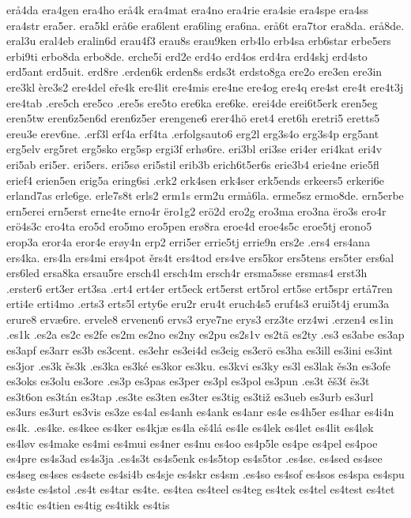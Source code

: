 erå4da
era4gen
era4ho
erå4k
era4mat
era4no
era4rie
era4sie
era4spe
era4ss
era4str
era5er.
era5kl
erå6e
era6lent
era6ling
era6na.
erå6t
era7tor
era8da.
erå8de.
eral3u
eral4eb
eralin6d
erau4f3
erau8s
erau9ken
erb4lo
erb4sa
erb6star
erbe5ers
erbi9ti
erbo8da
erbo8de.
erche5i
erd2e
erd4o
erd4os
erd4ra
erd4skj
erd4sto
erd5ant
erd5uit.
erd8re
.erden6k
erden8s
erds3t
erdsto8ga
ere2o
ere3en
ere3in
ere3kl
ère3s2
ere4del
eře4k
ere4lit
ere4mis
ere4ne
ere4og
ere4q
ere4st
ere4t
ere4t3j
ere4tab
.ere5ch
ere5co
.ere5s
ere5to
ere6ka
ere6ke.
erei4de
erei6t5erk
eren5eg
eren5tw
eren6z5en6d
eren6z5er
erengene6
erer4hö
eret4
eret6h
eretri5
eretts5
ereu3e
erev6ne.
.erf3l
erf4a
erf4ta
.erfolgsauto6
erg2l
erg3s4o
erg3s4p
erg5ant
erg5elv
erg5ret
erg5sko
erg5sp
ergi3f
erhø6re.
eri3bl
eri3se
eri4er
eri4kat
eri4v
eri5ab
eri5er.
eri5ers.
eri5sø
eri5stil
erib3b
erich6t5er6s
erie3b4
erie4ne
erie5fl
erief4
erien5en
erig5a
ering6si
.erk2
erk4sen
erk4ser
erk5ends
erkeers5
erkeri6e
erland7as
erle6ge.
erle7s8t
erls2
erm1s
erm2u
ermå6la.
erme5sz
ermo8de.
ern5erbe
ern5erei
ern5erst
erne4te
erno4r
ëro1g2
erö2d
ero2g
ero3ma
ero3na
ëro3s
ero4r
erö4s3c
ero4ta
ero5d
ero5mo
ero5pen
erø8ra
eroe4d
eroe4s5c
eroe5tj
erono5
erop3a
eror4a
eror4e
erøy4n
erp2
erri5er
errie5tj
errie9n
ers2e
.ers4
ers4ana
ers4ka.
ers4la
ers4mi
ers4pot
ěrs4t
ers4tod
ers4ve
ers5kor
ers5tens
ers5ter
ers6al
ers6led
ersa8ka
ersau5re
ersch4l
ersch4m
ersch4r
ersma5sse
ersmas4
erst3h
.erster6
ert3er
ert3sa
.ert4
ert4er
ert5eck
ert5erst
ert5rol
ert5se
ert5spr
ertå7ren
erti4e
erti4mo
.erts3
erts5l
erty6e
eru2r
eru4t
eruch4s5
eruf4s3
erui5t4j
erum3a
erure8
ervæ6re.
ervele8
ervenen6
ervs3
erye7ne
erys3
erz3te
erz4wi
.erzen4
es1in
.es1k
.es2a
es2c
es2fe
es2m
es2no
es2ny
es2pu
es2s1v
es2tä
es2ty
.es3
es3abe
es3ap
es3apf
es3arr
es3b
es3cent.
es3ehr
es3ei4d
es3eig
es3erö
es3ha
es3ill
es3ini
es3int
es3jor
.es3k
ěs3k
.es3ka
es3ké
es3kor
es3ku.
es3kvi
es3ky
es3l
es3lak
ěs3n
es3ofe
es3oks
es3olu
es3ore
.es3p
es3pas
es3per
es3pl
es3pol
es3pun
.es3t
ěš3ť
ës3t
es3t6on
es3tán
es3tap
.es3te
es3ten
es3ter
es3tig
es3tiž
es3ueb
es3urb
es3url
es3urs
es3urt
es3vis
es3ze
es4al
es4anh
es4ank
es4anr
es4e
es4h5er
es4har
es4i4n
es4k.
.es4ke.
es4kee
es4ker
es4kjæ
es4la
eš4lá
es4le
es4lek
es4let
es4lit
es4løk
es4løv
es4make
es4mi
es4mui
es4ner
es4nu
es4oo
es4p5le
es4pe
es4pel
es4poe
es4pre
es4s3ad
es4s3ja
.es4s3t
es4s5enk
es4s5top
es4s5tor
.es4se.
es4sed
es4see
es4seg
es4ses
es4sete
es4si4b
es4sje
es4skr
es4sm
.es4so
es4sof
es4sos
es4spa
es4spu
es4ste
es4stol
.es4t
es4tar
es4te.
es4tea
es4teel
es4teg
es4tek
es4tel
es4test
es4tet
es4tic
es4tien
es4tig
es4tikk
es4tis
